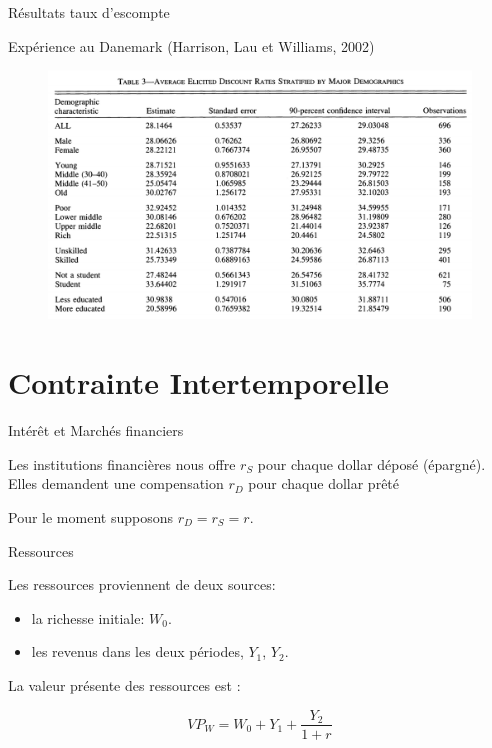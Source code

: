 \documentclass[handout]{beamer}
\begin{document}
\begin{frame}{Résultats taux d'escompte}

Expérience au Danemark  (Harrison, Lau et Williams, 2002)

\begin{figure}
\includegraphics[scale=0.5]{Results.png}
\end{figure}

\end{frame}

\section{Contrainte Intertemporelle}

\begin{frame}{Intérêt et Marchés financiers}

Les institutions financières nous offre $r_S$ pour chaque dollar déposé (épargné). Elles demandent une compensation $r_D$ pour chaque dollar prêté

Pour le moment supposons $r_D = r_S = r$. 

\end{frame}

\begin{frame}{Ressources}

Les ressources proviennent de deux sources:
\begin{itemize}
\item la richesse initiale: $W_0$. 
\item les revenus dans les deux périodes, $Y_1$, $Y_2$. 
\end{itemize}

La valeur présente des ressources est : 

$$ VP_W = W_0 + Y_1 + \frac{Y_2}{1+r} $$
 
\end{frame}
\end{document}
